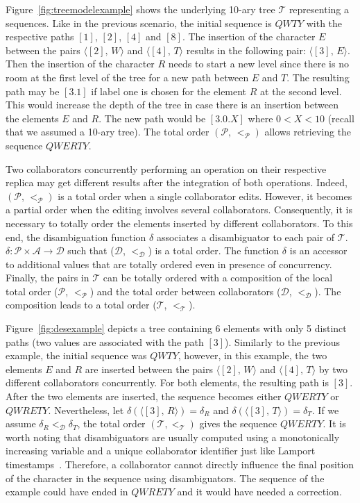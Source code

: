 Figure~\ref{fig:treemodelexample} shows the underlying 10-ary tree
$\mathcal{T}$ representing a sequences. Like in the previous scenario, the
initial sequence is $QWTY$ with the respective paths $[1]$, $[2]$, $[4]$ and
$[8]$. The insertion of the character $E$ between the pairs
$\langle [2],\, W\rangle$ and $\langle [4],\, T\rangle$ results in the
following pair: $\langle [3],\, E \rangle$. Then the insertion of the character
$R$ needs to start a new level since there is no room at the first level of the
tree for a new path between $E$ and $T$. The resulting path may be $[3.1]$ if
label one is chosen for the element $R$ at the second level. This would
increase the depth of the tree in case there is an insertion between the
elements $E$ and $R$. The new path would be $[3.0.X]$ where $0<X<10$ (recall
that we assumed a 10-ary tree). The total order $(\mathcal{P},\,<_\mathcal{P})$
allows retrieving the sequence $QWERTY$.

Two collaborators concurrently performing an operation on their respective
replica may get different results after the integration of both
operations. Indeed, $(\mathcal{P},\,<_\mathcal{P})$ is a total order when a
single collaborator edits. However, it becomes a partial order when the editing
involves several collaborators. Consequently, it is necessary to totally order
the elements inserted by different collaborators. To this end, the
disambiguation function $\delta$ associates a disambiguator to each pair of
$\mathcal{T}$. $\delta: \mathcal{P}\times\mathcal{A} \rightarrow \mathcal{D}$
such that ($\mathcal{D}$, $<_{\mathcal{D}}$) is a total order. The function
$\delta$ is an accessor to additional values that are totally ordered even in
presence of concurrency. Finally, the pairs in $\mathcal{T}$ can be totally
ordered with a composition of the local total order ($\mathcal{P}$,
$<_{\mathcal{P}}$) and the total order between collaborators ($\mathcal{D}$,
$<_{\mathcal{D}}$). The composition leads to a total order ($\mathcal{T}$,
$<_{\mathcal{T}}$).

Figure~\ref{fig:desexample} depicts a tree containing 6 elements with only 5
distinct paths (two values are associated with the path $[3]$). Similarly to
the previous example, the initial sequence was $QWTY$, however, in this
example, the two elements $E$ and $R$ are inserted between the pairs
$\langle [2],\, W\rangle$ and $\langle [4],\,T\rangle$ by two different
collaborators concurrently. For both elements, the resulting path is
$[3]$. After the two elements are inserted, the sequence becomes either
$QWERTY$ or $QWRETY$. Nevertheless, let
$\delta(\langle [3],\, R \rangle) = \delta_R$ and
$\delta(\langle [3],\, T\rangle) = \delta_T$. If we assume
$\delta_R <_\mathcal{D} \delta_T$, the total order
$(\mathcal{T}, <_\mathcal{T})$ gives the sequence $QWERTY$. It is worth noting
that disambiguators are usually computed using a monotonically increasing
variable and a unique collaborator identifier just like Lamport
timestamps~\cite{lamport1978time}. Therefore, a collaborator cannot directly
influence the final position of the character in the sequence using
disambiguators. The sequence of the example could have ended in $QWRETY$ and it
would have needed a correction.

